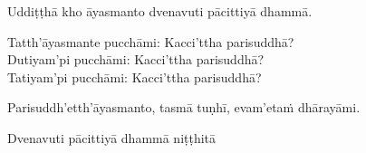 \medskip

\begin{center}
	Uddiṭṭhā kho āyasmanto dvenavuti pācittiyā dhammā.

	\smallskip

	Tatth'āyasmante pucchāmi: Kacci'ttha parisuddhā?\\
	Dutiyam'pi pucchāmi: Kacci'ttha parisuddhā?\\
	Tatiyam'pi pucchāmi: Kacci'ttha parisuddhā?

	\smallskip

	Parisuddh'etth'āyasmanto, tasmā tuṇhī, evam'etaṁ dhārayāmi.\makeatletter\hyperlink{endnote437-appendix}\makeatother \thinspace
\end{center}

\begin{outro}
	Dvenavuti pācittiyā dhammā niṭṭhitā
\end{outro}

\clearpage

